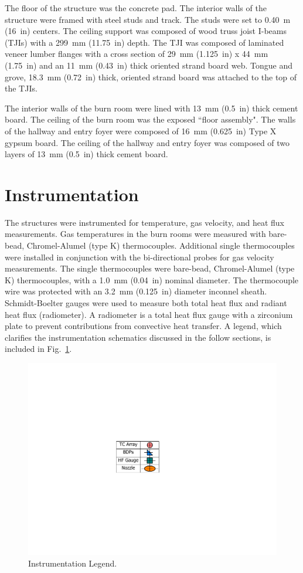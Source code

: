 \documentclass[12pt,oneside]{book}
\begin{document}
The floor of the structure was the concrete pad. The interior walls of the structure were framed with steel studs and track.  The studs were set to 0.40~m (16~in) centers. The ceiling support was composed of wood truss joist I-beams (TJIs) with a 299~mm (11.75~in) depth. The TJI was composed of laminated veneer lumber flanges with a cross section of 29~mm (1.125~in) x 44~mm (1.75~in) and an 11~mm (0.43~in) thick oriented strand board web. Tongue and grove, 18.3~mm (0.72~in) thick, oriented strand board was attached to the top of the TJIs.

The interior walls of the burn room were lined with 13~mm (0.5~in) thick cement board. The ceiling of the burn room was the exposed ``floor assembly". The walls of the hallway and entry foyer were composed of 16~mm (0.625~in) Type X gypsum board. The ceiling of the hallway and entry foyer was composed of two layers of 13~mm (0.5~in) thick cement board.

\clearpage

\section{Instrumentation}
\label{sec:Instrumentation}

The structures were instrumented for temperature, gas velocity, and heat flux measurements. Gas temperatures in the burn rooms were measured with bare-bead, Chromel-Alumel (type K) thermocouples. Additional single thermocouples were installed in conjunction with the bi-directional probes for gas velocity measurements. The single thermocouples were bare-bead, Chromel-Alumel (type K) thermocouples, with a 1.0~mm (0.04~in) nominal diameter. The thermocouple wire was protected with an 3.2~mm (0.125~in) diameter inconnel sheath. Schmidt-Boelter gauges were used to measure both total heat flux and radiant heat flux (radiometer). A radiometer is a total heat flux gauge with a zirconium plate to prevent contributions from convective heat transfer. A legend, which clarifies the instrumentation schematics discussed in the follow sections, is included in Fig.~\ref{fig:Instrumentation_Legend}.

\begin{figure}[!ht]
	\includegraphics[width=.35\columnwidth]{../Figures/Floor_Plans/PDFs/DelCo_2012_Instrumentation_Legend.pdf}
	\caption{Instrumentation Legend.}
	\label{fig:Instrumentation_Legend}
\end{figure}
\end{document}

